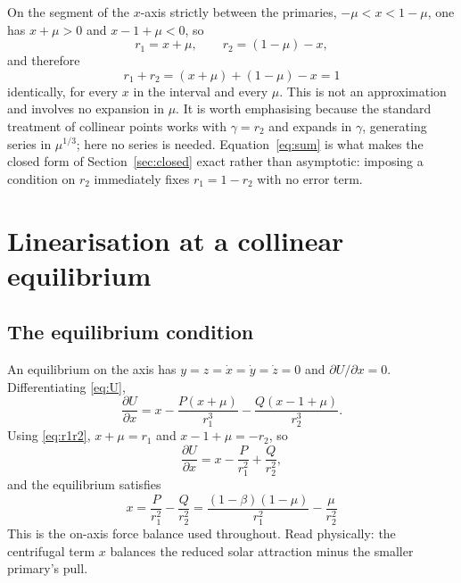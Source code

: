 \documentclass[11pt,a4paper]{article}
\begin{document}
On the segment of the $x$-axis strictly between the primaries,
$-\mu<x<1-\mu$, one has $x+\mu>0$ and $x-1+\mu<0$, so
\begin{equation}
  r_1 = x+\mu, \qquad r_2 = (1-\mu)-x,
  \label{eq:r1r2}
\end{equation}
and therefore
\begin{equation}
  r_1+r_2 = (x+\mu) + (1-\mu) - x = 1
  \label{eq:sum}
\end{equation}
identically, for every $x$ in the interval and every $\mu$. This is not an
approximation and involves no expansion in $\mu$. It is worth emphasising
because the standard treatment of collinear points works with
$\gamma=r_2$ and expands in $\gamma$, generating series in $\mu^{1/3}$; here no
series is needed. Equation~\eqref{eq:sum} is what makes the closed form of
Section~\ref{sec:closed} exact rather than asymptotic: imposing a condition on
$r_2$ immediately fixes $r_1=1-r_2$ with no error term.

\section{Linearisation at a collinear equilibrium}\label{sec:lin}

\subsection{The equilibrium condition}

An equilibrium on the axis has $y=z=\dot x=\dot y=\dot z=0$ and
$\partial U/\partial x=0$. Differentiating \eqref{eq:U},
\begin{equation}
  \frac{\partial U}{\partial x}
  = x - \frac{P(x+\mu)}{r_1^3} - \frac{Q(x-1+\mu)}{r_2^3} .
\end{equation}
Using \eqref{eq:r1r2}, $x+\mu=r_1$ and $x-1+\mu=-r_2$, so
\begin{equation}
  \frac{\partial U}{\partial x} = x - \frac{P}{r_1^2} + \frac{Q}{r_2^2},
\end{equation}
and the equilibrium satisfies
\begin{equation}
  \boxed{\;x = \frac{P}{r_1^2} - \frac{Q}{r_2^2}
           = \frac{(1-\beta)(1-\mu)}{r_1^2} - \frac{\mu}{r_2^2}\;}
  \label{eq:balance}
\end{equation}
This is the on-axis force balance used throughout. Read physically: the
centrifugal term $x$ balances the reduced solar attraction minus the smaller
primary's pull.
\end{document}
